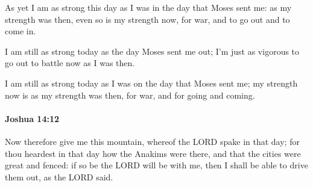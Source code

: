 			\begin{versebox}
					\item[BHS] 
					\item[ASV] As yet I am as strong this day as I was in the day that Moses sent me: as my strength was then, even so is my strength now, for war, and to go out and to come in.
					\item[NIV] I am still as strong today as the day Moses sent me out; I’m just as vigorous to go out to battle now as I was then.
					\item[NRSV] I am still as strong today as I was on the day that Moses sent me; my strength now is as my strength was then, for war, and for going and coming.
			\end{versebox}

		\paragraph{Joshua 14:12} %
			\label{JOSHUA-14-12}

			Now therefore give me this mountain, whereof the LORD spake in that day; for thou heardest in that day how the Anakims were there, and that the cities were great and fenced: if so be the LORD will be with me, then I shall be able to drive them out, as the LORD said.

